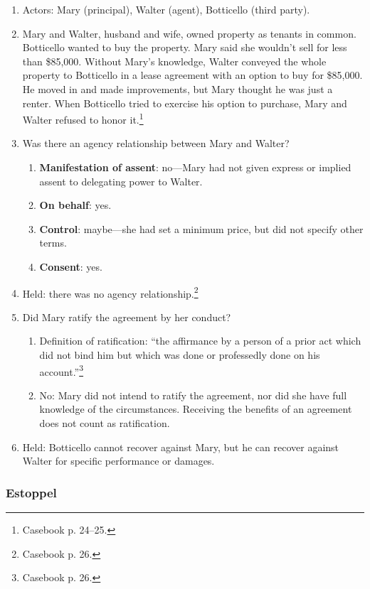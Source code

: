 \begin{enumerate}
    \item Actors: Mary (principal), Walter (agent), Botticello (third party).
    \item Mary and Walter, husband and wife, owned property as tenants in 
    common. Botticello wanted to buy the property. Mary said she wouldn't sell 
    for less than \$85,000. Without Mary's knowledge, Walter conveyed the 
    whole property to Botticello in a lease agreement with an option to buy 
    for \$85,000. He moved in and made improvements, but Mary thought he was 
    just a renter. When Botticello tried to exercise his option to purchase, 
    Mary and Walter refused to honor it.\footnote{Casebook p. 24--25.}
    \item Was there an agency relationship between Mary and Walter?
    \begin{enumerate}
        \item \textbf{Manifestation of assent}: no---Mary had not given 
        express or implied assent to delegating power to Walter.
        \item \textbf{On behalf}: yes.
        \item \textbf{Control}: maybe---she had set a minimum price, but did 
        not specify other terms.
        \item \textbf{Consent}: yes.
    \end{enumerate}
    \item Held: there was no agency relationship.\footnote{Casebook p. 26.}
    \item Did Mary ratify the agreement by her conduct?
    \begin{enumerate}
        \item Definition of ratification: ``the affirmance by a person of a 
        prior act which did not bind him but which was done or professedly 
        done on his account.''\footnote{Casebook p. 26.}
        \item No: Mary did not intend to ratify the agreement, nor did she 
        have full knowledge of the circumstances. Receiving the benefits of an 
        agreement does not count as ratification.
    \end{enumerate}
    \item Held: Botticello cannot recover against Mary, but he can recover 
    against Walter for specific performance or damages.
\end{enumerate}

\subsubsection{Estoppel}

